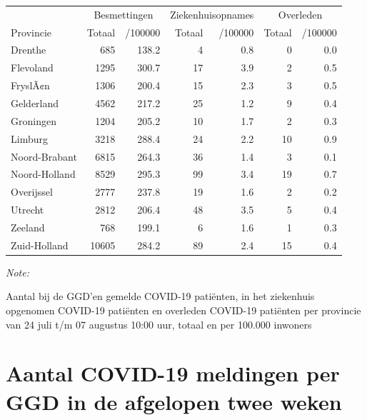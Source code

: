 \documentclass[
  english,
  man,floatsintext]{apa6}
\begin{document}
\begin{table}
\centering
\begin{threeparttable}
\begin{tabular}{lrrrrrr}
\toprule
\multicolumn{1}{c}{ } & \multicolumn{2}{c}{Besmettingen} & \multicolumn{2}{c}{Ziekenhuisopnames} & \multicolumn{2}{c}{Overleden} \\
\cmidrule(l{3pt}r{3pt}){2-3} \cmidrule(l{3pt}r{3pt}){4-5} \cmidrule(l{3pt}r{3pt}){6-7}
Provincie & Totaal & /100000 & Totaal & /100000 & Totaal & /100000\\
\midrule
Drenthe & 685 & 138.2 & 4 & 0.8 & 0 & 0.0\\
Flevoland & 1295 & 300.7 & 17 & 3.9 & 2 & 0.5\\
FryslÃ¢n & 1306 & 200.4 & 15 & 2.3 & 3 & 0.5\\
Gelderland & 4562 & 217.2 & 25 & 1.2 & 9 & 0.4\\
Groningen & 1204 & 205.2 & 10 & 1.7 & 2 & 0.3\\
Limburg & 3218 & 288.4 & 24 & 2.2 & 10 & 0.9\\
Noord-Brabant & 6815 & 264.3 & 36 & 1.4 & 3 & 0.1\\
Noord-Holland & 8529 & 295.3 & 99 & 3.4 & 19 & 0.7\\
Overijssel & 2777 & 237.8 & 19 & 1.6 & 2 & 0.2\\
Utrecht & 2812 & 206.4 & 48 & 3.5 & 5 & 0.4\\
Zeeland & 768 & 199.1 & 6 & 1.6 & 1 & 0.3\\
Zuid-Holland & 10605 & 284.2 & 89 & 2.4 & 15 & 0.4\\
\bottomrule
\end{tabular}
\begin{tablenotes}
\item \textit{Note: } 
\item Aantal bij de GGD’en gemelde COVID-19 patiënten, in het ziekenhuis opgenomen COVID-19 patiënten en overleden COVID-19 patiënten per provincie van 24 juli t/m 07 augustus 10:00 uur, totaal en per 100.000 inwoners
\end{tablenotes}
\end{threeparttable}
\end{table}

\newpage

\hypertarget{aantal-covid-19-meldingen-per-ggd-in-de-afgelopen-twee-weken}{%
\section{Aantal COVID-19 meldingen per GGD in de afgelopen twee weken}\label{aantal-covid-19-meldingen-per-ggd-in-de-afgelopen-twee-weken}}
\end{document}
